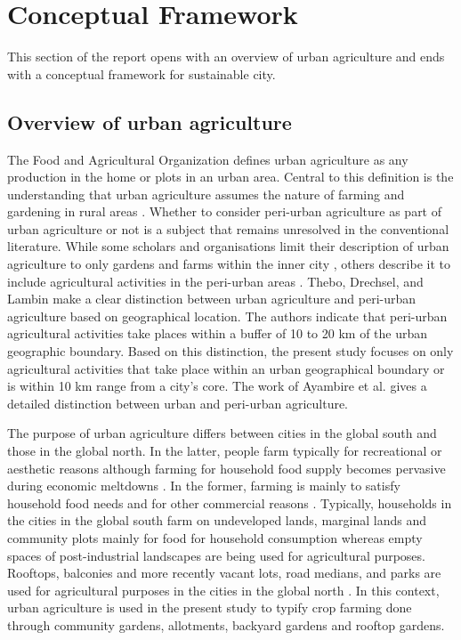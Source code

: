 \chapter{Conceptual Framework} %

\label{Chapter:ConceptualFramework}

This section of the report opens with an overview of urban agriculture and ends with a conceptual framework for sustainable city.

\section{Overview of urban agriculture}

The Food and Agricultural Organization \cite{FAO2003} defines urban agriculture as any production in the home or plots in an urban area. Central to this definition is the understanding that urban agriculture assumes the nature of farming and gardening in rural areas \cite{Opitz2016}. Whether to consider peri-urban agriculture as part of urban agriculture or not is a subject that remains unresolved in the conventional literature. While some scholars and organisations limit their description of urban agriculture to only gardens and farms within the inner city \cite{NewYorkN.Y..DepartmentofParksandRecreation.2010}, others describe it to include agricultural activities in the peri-urban areas \cite{Mok2014}. Thebo, Drechsel, and Lambin \cite{Thebo2014} make a clear distinction between urban agriculture and peri-urban agriculture based on geographical location. The authors indicate that peri-urban agricultural activities take places within a buffer of 10 to 20 km of the urban geographic boundary. Based on this distinction, the present study focuses on only agricultural activities that take place within an urban geographical boundary or is within 10 km range from a city's core. The work of Ayambire et al. \cite{Ayambire2019} gives a detailed distinction between urban and peri-urban agriculture.

The purpose of urban agriculture differs between cities in the global south and those in the global north. In the latter, people farm typically for recreational or aesthetic reasons although farming for household food supply becomes pervasive during economic meltdowns \cite{McClintock2010}. In the former, farming is mainly to satisfy household food needs and for other commercial reasons \cite{Amponsah2016, McClintock2010}. Typically, households in the cities in the global south farm on undeveloped lands, marginal lands and community plots mainly for food for household consumption whereas empty spaces of post-industrial landscapes are being used for agricultural purposes. Rooftops, balconies and more recently vacant lots, road medians, and parks are used for agricultural purposes in the cities in the global north \cite{McClintock2010}. In this context, urban agriculture is used in the present study to typify crop farming done through community gardens, allotments, backyard gardens and rooftop gardens.


